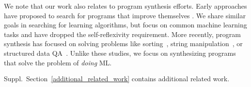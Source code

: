 We note that our work also relates to program synthesis efforts. Early approaches have proposed to search for programs that improve themselves \cite{lenat1983eurisko,schmidhuber1987evolutionary}. We share similar goals in searching for learning algorithms, but focus on common machine learning tasks and have dropped the self-reflexivity requirement. More recently, program synthesis has focused on solving problems like sorting~\cite{graves2014neural}, string manipulation~\cite{gulwani2017program,balog2017deepcoder}, or structured data QA~\cite{Liang2016NeuralSM}. Unlike these studies, we focus on synthesizing programs that solve the problem of \textit{doing} ML. 

Suppl.\ Section~\ref{additional_related_work} contains additional related work.